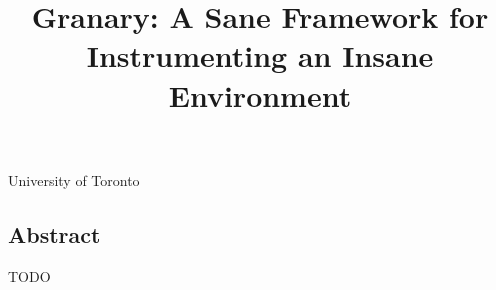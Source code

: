\documentclass{sigplanconf}
\begin{document}

\title{Granary: A Sane Framework for Instrumenting an Insane Environment}

{University of Toronto}{}


\maketitle
\subsection*{Abstract}
TODO

%
\end{document}
